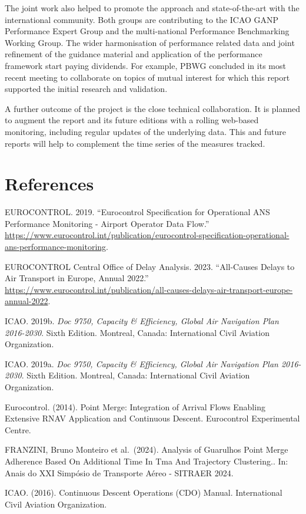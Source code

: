 \documentclass[
  a4paper,
  DIV=11,
  numbers=noendperiod]{scrreport}
\newlength{\cslhangindent}
\newenvironment{CSLReferences}[2] %
 {\begin{list}{}{%
  \setlength{\itemindent}{0pt}
  \setlength{\leftmargin}{0pt}
  \setlength{\parsep}{0pt}
  \ifodd #1
   \setlength{\leftmargin}{\cslhangindent}
   \setlength{\itemindent}{-1\cslhangindent}
  \fi
  \setlength{\itemsep}{#2\baselineskip}}}
 {\end{list}}
\begin{document}
The joint work also helped to promote the approach and state-of-the-art
with the international community. Both groups are contributing to the
ICAO GANP Performance Expert Group and the multi-national Performance
Benchmarking Working Group. The wider harmonisation of performance
related data and joint refinement of the guidance material and
application of the performance framework start paying dividends. For
example, PBWG concluded in its most recent meeting to collaborate on
topics of mutual interest for which this report supported the initial
research and validation.

A further outcome of the project is the close technical collaboration.
It is planned to augment the report and its future editions with a
rolling web-based monitoring, including regular updates of the
underlying data. This and future reports will help to complement the
time series of the measures tracked.


\chapter*{References}\label{references}


\label{refs}
\begin{CSLReferences}{1}{0}
EUROCONTROL. 2019. {``Eurocontrol {Specification} for {Operational ANS
Performance Monitoring} - {Airport Operator Data Flow}.''}
\url{https://www.eurocontrol.int/publication/eurocontrol-specification-operational-ans-performance-monitoring}.

EUROCONTROL Central Office of Delay Analysis. 2023. {``All-Causes Delays
to Air Transport in Europe, Annual 2022.''}
\url{https://www.eurocontrol.int/publication/all-causes-delays-air-transport-europe-annual-2022}.

ICAO. 2019b. \emph{Doc 9750, {Capacity} \& {Efficiency}, {Global Air
Navigation Plan} 2016-2030}. Sixth Edition. {Montreal, Canada}:
{International Civil Aviation Organization}.

ICAO. 2019a. \emph{Doc 9750, Capacity \& Efficiency, Global Air
Navigation Plan 2016-2030}. Sixth Edition. Montreal, Canada:
International Civil Aviation Organization.

\end{CSLReferences}

Eurocontrol. (2014). Point Merge: Integration of Arrival Flows Enabling
Extensive RNAV Application and Continuous Descent. Eurocontrol
Experimental Centre.

FRANZINI, Bruno Monteiro et al.~(2024). Analysis of Guarulhos Point
Merge Adherence Based On Additional Time In Tma And Trajectory
Clustering.. In: Anais do XXI Simpósio de Transporte Aéreo - SITRAER
2024.

ICAO. (2016). Continuous Descent Operations (CDO) Manual. International
Civil Aviation Organization.
\end{document}

